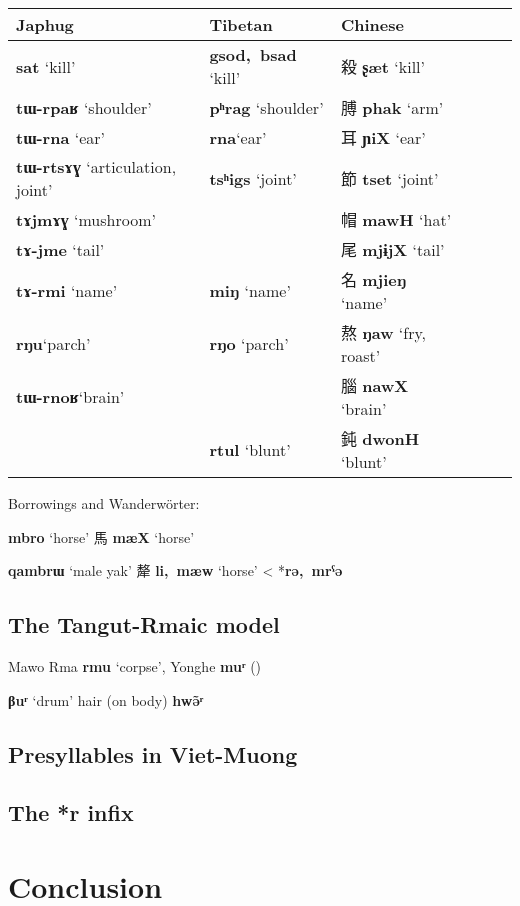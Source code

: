 \documentclass[oneside,a4paper,11pt]{article}
\newcommand{\ipa}[1]{{\phon\mbox{\textbf{#1}}}}
\newcommand{\zh}[1]{{\cn #1}}
\newcommand{\ch}[3]{\zh{#1} \ipa{#2} `#3'}
\begin{document}
\begin{tabular}{llllll}
\toprule
Japhug & Tibetan & Chinese \\
\midrule
\ipa{sat} `kill' &\ipa{gsod, bsad} `kill'& \ch{殺}{ʂæt}{kill} \\
\ipa{tɯ-rpaʁ} `shoulder'& \ipa{pʰrag} `shoulder'& \ch{膊}{phak}{arm} \\
\ipa{tɯ-rna} `ear'& \ipa{rna}`ear' & \ch{耳}{ɲiX}{ear} \\
\ipa{tɯ-rtsɤɣ} `articulation, joint'& \ipa{tsʰigs} `joint'& \ch{節}{tset}{joint} \\
\ipa{tɤjmɤɣ} `mushroom' &&\ch{帽}{mawH}{hat} \\
\ipa{tɤ-jme} `tail' &&\ch{尾}{mjɨjX}{tail} \\
\ipa{tɤ-rmi} `name'& \ipa{miŋ} `name'& \ch{名}{mjieŋ}{name} \\ 
\ipa{rŋu}`parch'& \ipa{rŋo} `parch'& \ch{熬}{ŋaw}{fry, roast} \\
\ipa{tɯ-rnoʁ}`brain' && \ch{腦}{nawX}{brain} \\
&\ipa{rtul} `blunt' & \ch{鈍}{dwonH}{blunt} \\
\bottomrule
\end{tabular}


Borrowings and Wanderwörter:

\ipa{mbro} `horse' \ch{馬}{mæX}{horse}

\ipa{qambrɯ} `male yak' \ch{犛}{li, mæw}{horse} < *\ipa{rə, mrˁə}

\subsection{The Tangut-Rmaic model}
 
 Mawo Rma \ipa{rmu} `corpse', Yonghe \ipa{muʳ} (\citealt[41]{sims14yonghe})

\ipa{βuʳ} `drum'
hair (on body) \ipa{hwə̃ʳ}
\subsection{Presyllables in Viet-Muong}

\subsection{The *r infix}

 \citet{sagart99roc}


%


 

 

 

\section{Conclusion}




\end{document}
